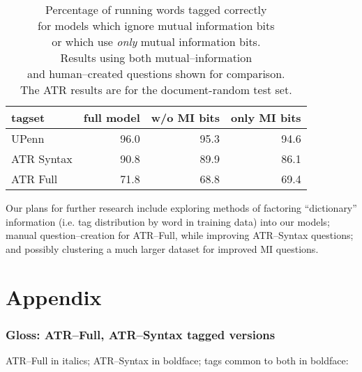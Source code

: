 \begin{table}
\caption{Percentage of running words tagged correctly\\
for models which ignore mutual information bits\\
or which use {\em only} mutual information bits.\\
Results using both mutual--information \\
and human--created questions shown for comparison.\\
The ATR results are for the document-random test set.
}
\begin{center}
\renewcommand{\arraystretch}{}
\begin{tabular}{||l|*{3}{r|}|}
\hline
tagset      & full model  & w/o MI bits  & only MI bits\\ \hline
UPenn       & 96.0        & 95.3         & 94.6        \\ \hline
ATR Syntax  & 90.8        & 89.9         & 86.1        \\ \hline
ATR Full    & 71.8        & 68.8         & 69.4        \\ \hline
\end{tabular}
\renewcommand{\arraystretch}{}
\label{MIBITS.table}
\end{center}
\end{table}


Our plans for further research include exploring methods of factoring
``dictionary'' information (i.e. tag distribution by word in
training data) into our models; manual question--creation for ATR--Full,
while improving ATR--Syntax questions; and possibly clustering a much
larger dataset for improved MI questions.

\section{Appendix}

\subsubsection*{Gloss: ATR--Full, ATR--Syntax tagged versions}
ATR--Full in italics; ATR--Syntax in boldface; tags common to both in boldface:

